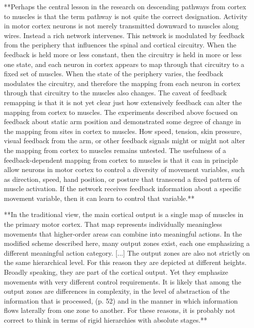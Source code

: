 \documentclass[../main.tex]{subfiles}
\begin{document}
{{**Perhaps the central lesson in the research on descending pathways from cortex to muscles is that the term pathway is not quite the correct designation. Activity in motor cortex neurons is not merely transmitted downward to muscles along wires. Instead a rich network intervenes. This network is modulated by feedback from the periphery that influences the spinal and cortical circuitry. When the feedback is held more or less constant, then the circuitry is held in more or less one state, and each neuron in cortex appears to map through that circuitry to a fixed set of muscles. When the state of the periphery varies, the feedback modulates the circuitry, and therefore the mapping from each neuron in cortex through that circuitry to the muscles also changes. The caveat of feedback remapping is that it is not yet clear just how extensively feedback can alter the mapping from cortex to muscles. The experiments described above focused on feedback about static arm position and demonstrated some degree of change in the mapping from sites in cortex to muscles. How speed, tension, skin pressure, visual feedback from the arm, or other feedback signals might or might not alter the mapping from cortex to muscles remains untested. The usefulness of a feedback-dependent mapping from cortex to muscles is that it can in principle allow neurons in motor cortex to control a diversity of movement variables, such as direction, speed, hand position, or posture that transcend a fixed pattern of muscle activation. If the network receives feedback information about a specific movement variable, then it can learn to control that variable.**


**In the traditional view, the main cortical output is a single map of muscles in the primary motor cortex. That map represents individually meaningless movements that higher-order areas can combine into meaningful actions. In the modified scheme described here, many output zones exist, each one emphasizing a different meaningful action category. [...] The output zones are also not strictly on the same hierarchical level. For this reason they are depicted at different heights. Broadly speaking, they are part of the cortical output. Yet they emphasize movements with very different control requirements. It is likely that among the output zones are differences in complexity, in the level of abstraction of the information that is processed, (p. 52) and in the manner in which information flows laterally from one zone to another. For these reasons, it is probably not correct to think in terms of rigid hierarchies with absolute stages.**

}}
\end{document}
